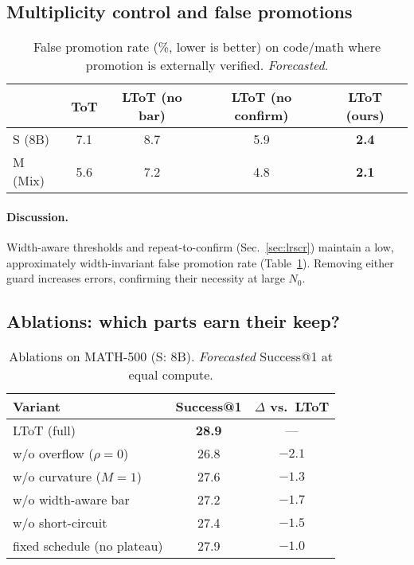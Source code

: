 \documentclass{article}
\begin{document}
\subsection{Multiplicity control and false promotions}
\label{subsec:false-promotions}

\begin{table}[t]
\centering
\caption{False promotion rate (\%, lower is better) on code/math where promotion is externally verified. \emph{Forecasted}.}
\vspace{0.3em}
\begin{tabular}{lcccc}
\toprule
 & \textbf{ToT} & \textbf{LToT (no bar)} & \textbf{LToT (no confirm)} & \textbf{LToT (ours)} \\
\midrule
S (8B)  & 7.1  & 8.7  & 5.9  & \textbf{2.4} \\
M (Mix) & 5.6  & 7.2  & 4.8  & \textbf{2.1} \\
\bottomrule
\end{tabular}
\label{tab:false-promotions}
\end{table}

\paragraph{Discussion.}
Width-aware thresholds and repeat-to-confirm (Sec.~\ref{sec:lrscr}) maintain a low, approximately width-invariant false promotion rate (Table~\ref{tab:false-promotions}).
Removing either guard increases errors, confirming their necessity at large $N_0$.

\subsection{Ablations: which parts earn their keep?}
\label{subsec:ablations}

\begin{table}[t]
\centering
\caption{Ablations on MATH-500 (S: 8B). \emph{Forecasted} Success@1 at equal compute.}
\vspace{0.3em}
\begin{tabular}{lcc}
\toprule
\textbf{Variant} & \textbf{Success@1} & \textbf{$\Delta$ vs.\ LToT} \\
\midrule
LToT (full)                         & \textbf{28.9} & --- \\
\quad w/o overflow ($\rho{=}0$)     & 26.8 & $-2.1$ \\
\quad w/o curvature ($M{=}1$)       & 27.6 & $-1.3$ \\
\quad w/o width-aware bar           & 27.2 & $-1.7$ \\
\quad w/o short-circuit             & 27.4 & $-1.5$ \\
\quad fixed schedule (no plateau)   & 27.9 & $-1.0$ \\
\bottomrule
\end{tabular}
\label{tab:ablations}
\end{table}
\end{document}
